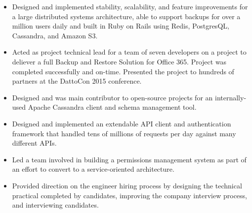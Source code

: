 \documentclass[11pt,a4paper,sans]{moderncv}
\begin{document}
{ \begin{itemize} \itemsep -1pt
  \item Designed and implemented stability, scalability, and feature improvements for a large distributed systems architecture, able to support backups for over a million users daily and built in Ruby on Rails using Redis, PostgresQL, Cassandra, and Amazon S3.
  \item Acted as project technical lead for a team of seven developers on a project to deliever a full Backup and Restore Solution for Office 365. Project was completed successfully and on-time. Presented the project to hundreds of partners at the DattoCon 2015 conference.
  \item Designed and was main contributor to open-source projects for an internally-used Apache Cassandra client and schema management tool.
  \item Designed and implemented an extendable API client and authentication framework that handled tens of millions of requests per day against many different APIs.
  \item Led a team involved in building a permissions management system as part of an effort to convert to a service-oriented architecture.
  \item Provided direction on the engineer hiring process by designing the technical practical completed by candidates, improving the company interview process, and interviewing candidates.
\end{itemize} }
  
\end{document}
